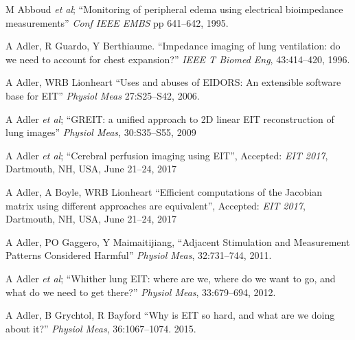 \documentclass[12pt]{article} \usepackage[margin=3cm]{geometry} \usepackage[margin=20pt,font=small,labelfont=bf]{caption}\def\TBLWIDA{35mm}\def\TBLWIDB{95mm}
\newcommand{\ifmaxthree}[2]{#2 {\em et al}; }
\begin{document}
\begin{thebibliography}{00}
      \setlength{\parskip}{0ex}%
      \setlength{\itemsep}{0ex}%
\ifmaxthree{
M Abboud, R Guardo, R Martineau, J Taillefer, C  Pelletier, 
}{
M Abboud
}
``Monitoring of peripheral edema using electrical bioimpedance measurements''
{\em Conf IEEE EMBS} pp 641--642, 1995.

A Adler, R Guardo, Y Berthiaume. 
``Impedance imaging of lung ventilation: do we need to account for chest expansion?''
{\em  IEEE T Biomed Eng}, 43:414--420, 1996.


A Adler, WRB Lionheart
``Uses and abuses of EIDORS: An extensible software base for EIT''
{\em Physiol Meas} 27:S25--S42, 2006.

\ifmaxthree{
A Adler, JH Arnold, R Bayford, A Borsic, B Brown, P Dixon, TJC Faes, I Frerichs, H Gagnon, Y Gärber, B Grychtol, G Hahn, WRB Lionheart, A Malik, RP Patterson, J Stocks, A Tizzard, N Weiler, GK Wolf
}{
A Adler
}
``GREIT: a unified approach to 2D linear EIT reconstruction of lung images''
{\em Physiol Meas}, 30:S35--S55, 2009


\ifmaxthree{
A Adler, M Faulkner, K Aristovich, S Hannan, J Avery, DS Holder
}{
A Adler
}
``Cerebral perfusion imaging using EIT'',
Accepted: {\em EIT 2017}, Dartmouth, NH, USA, June 21--24, 2017

A Adler, A Boyle, WRB Lionheart
``Efficient computations of the Jacobian matrix using different
approaches are equivalent'',
Accepted: {\em EIT 2017}, Dartmouth, NH, USA, June 21--24, 2017


A Adler, PO Gaggero, Y Maimaitijiang,
``Adjacent Stimulation and Measurement Patterns Considered Harmful''
{\em Physiol Meas}, 32:731--744, 2011.


\ifmaxthree{
A Adler, MB Amato, JH Arnold, R Bayford, M Bodenstein, SH Böhm, BH Brown, I Frerichs, O Stenqvist, N Weiler, GK Wolf,
}{
A Adler
}
``Whither lung EIT: where are we, where do we want to go, and what do we need to get there?''
{\em Physiol Meas}, 33:679--694, 2012. 

A Adler, B Grychtol, R Bayford
``Why is EIT so hard, and what are we doing about it?''
{\em Physiol Meas}, 36:1067--1074. 2015.


\end{thebibliography}
\end{document}
